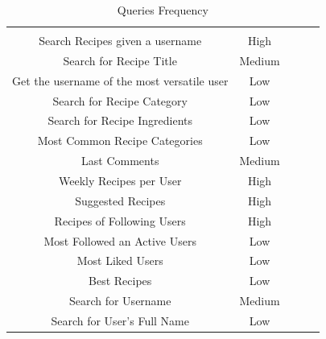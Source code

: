 \documentclass[a4paper]{report}
\begin{document}
\begin{table}[htpb]
	\centering
	\caption{Queries Frequency}
	\label{table: Queries Frequency}
	\begin{tabular}{|c|c|lll}
		\cline{1-2}
		\cellcolor[HTML]{000000}{\color[HTML]{FFFFFF} Query} &
		\cellcolor[HTML]{000000}{\color[HTML]{FFFFFF} Frequency} &
		\multicolumn{1}{c}{\cellcolor[HTML]{FFFFFF}{\color[HTML]{FFFFFF} }} &
		&
		\\ \cline{1-2}
		Search Recipes given a username             & High   & \cellcolor[HTML]{FFFFFF} &  &  \\ \cline{1-2}
		Search for Recipe Title                     & Medium & \cellcolor[HTML]{FFFFFF} &  &  \\ \cline{1-2}
		Get the username of the most versatile user & Low    &                          &  &  \\ \cline{1-2}
		Search for Recipe Category                  & Low    &                          &  &  \\ \cline{1-2}
		Search for Recipe Ingredients               & Low    &                          &  &  \\ \cline{1-2}
		Most Common Recipe Categories               & Low    &                          &  &  \\ \cline{1-2}
		Last Comments                               & Medium &                          &  &  \\ \cline{1-2}
		Weekly Recipes per User                     & High   &                          &  &  \\ \cline{1-2}
		Suggested Recipes                           & High   &                          &  &  \\ \cline{1-2}
		Recipes of Following Users                  & High   &                          &  &  \\ \cline{1-2}
		Most Followed an Active Users               & Low    &                          &  &  \\ \cline{1-2}
		Most Liked Users                            & Low    &                          &  &  \\ \cline{1-2}
		Best Recipes                                & Low    &                          &  &  \\ \cline{1-2}
		Search for Username                         & Medium &                          &  &  \\ \cline{1-2}
		Search for User's Full Name                 & Low    &                          &  &  \\ \cline{1-2}
	\end{tabular}
\end{table}
\end{document}
